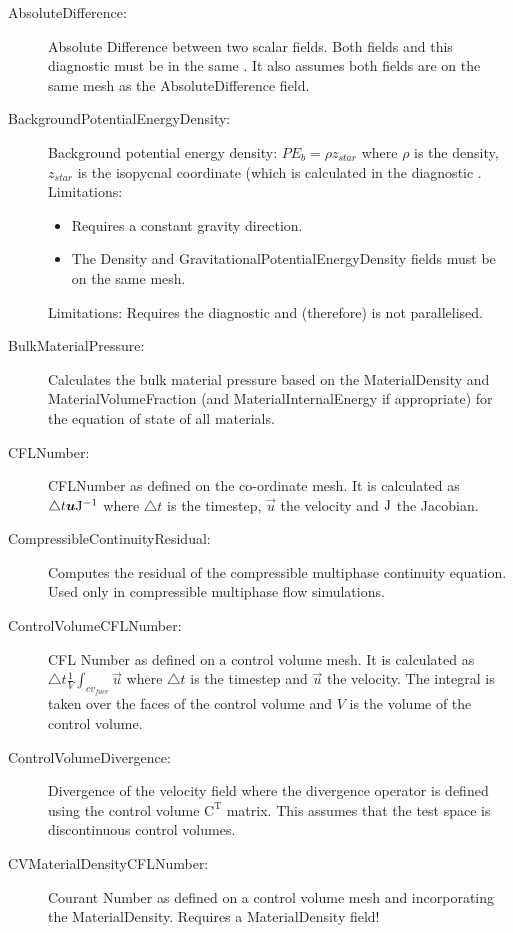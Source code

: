\begin{description}
\item[AbsoluteDifference:]Absolute Difference between two scalar fields. Both fields and this diagnostic  must be in the same . It also assumes both fields are on the same mesh as the AbsoluteDifference field.
\item[BackgroundPotentialEnergyDensity:]Background potential energy density: $PE_b = \rho z_{star}$ where $\rho$ is the density, $z_{star}$ is the isopycnal coordinate (which is calculated in the diagnostic . \\Limitations:
	\begin{itemize}
	\item Requires a constant gravity direction.
	\item The Density and GravitationalPotentialEnergyDensity fields must be on the same mesh.
	\end{itemize}
Limitations: Requires the diagnostic  and (therefore) is not parallelised.
\item[BulkMaterialPressure:]Calculates the bulk material pressure based on the MaterialDensity and MaterialVolumeFraction (and MaterialInternalEnergy if appropriate) for the equation of state of all materials.
\item[CFLNumber:]CFLNumber as defined on the co-ordinate mesh. It is calculated as $\triangle t {\mbox{\boldmath$u$}} \mathrm{J}^{-1}$ where $\triangle t$ is the timestep, $\vec{u}$ the velocity and $\mathrm{J}$ the Jacobian.
\item[CompressibleContinuityResidual:]Computes the residual of the compressible multiphase continuity equation. Used only in compressible multiphase flow simulations.
\item[ControlVolumeCFLNumber:]CFL Number as defined on a control volume mesh. It is calculated as $\triangle t \frac{1}{V} \int _{cv_{face}} \vec{u}$ where $\triangle t$ is the timestep and $\vec{u}$ the velocity. The integral is taken over the faces of the control volume and $V$ is the volume of the control volume.
\item[ControlVolumeDivergence:]Divergence of the velocity field where the divergence operator is defined using the control volume $\mathrm{C}^\mathrm{T}$ matrix. This assumes that the test space is discontinuous control volumes.
\item[CVMaterialDensityCFLNumber:]Courant Number as defined on a control volume mesh and incorporating the MaterialDensity. Requires a MaterialDensity field!

\end{description}
